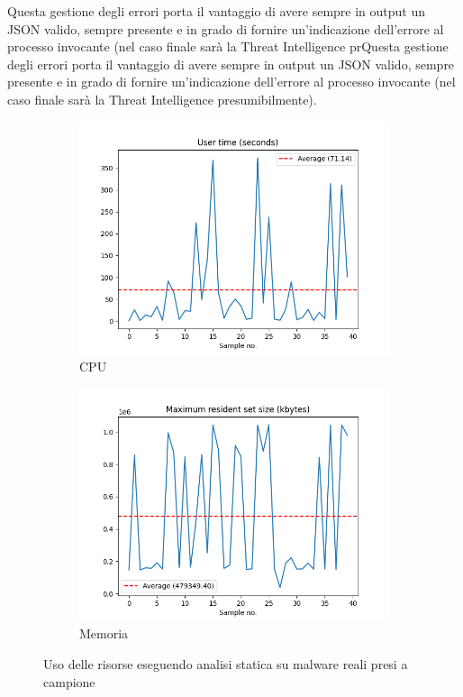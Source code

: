 Questa gestione degli errori porta il vantaggio di avere sempre in output un JSON valido, sempre presente e in grado di fornire un'indicazione dell'errore al processo invocante (nel caso finale sarà la Threat Intelligence prQuesta gestione degli errori porta il vantaggio di avere sempre in output un JSON valido, sempre presente e in grado di fornire un'indicazione dell'errore al processo invocante (nel caso finale sarà la Threat Intelligence presumibilmente).

\begin{figure}[htbp]
     \begin{subfigure}[b]{0.5\textwidth}
         \centering
         \includegraphics[width=\textwidth]{assets/static_analysis_exec_cpu_time.png}
         \caption{CPU}
         \label{fig:static_analysis_exec_cpu_time}
     \end{subfigure}
     \begin{subfigure}[b]{0.5\textwidth}
         \centering
         \includegraphics[width=\textwidth]{assets/static_analysis_exec_memory.png}
         \caption{Memoria}
         \label{fig:static_analysis_exec_memory}
     \end{subfigure}
     \caption{Uso delle risorse eseguendo analisi statica su malware reali presi a campione}
\end{figure}

